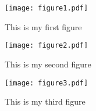 \documentclass{article}
\begin{document}
\begin{figure}[]
  \centering
  \texttt{[image: figure1.pdf]}
  \caption{This is my first figure}
  \label{fig:figure1}
\end{figure}

\begin{figure}[]
  \centering
  \texttt{[image: figure2.pdf]}
  \caption{This is my second figure}
  \label{fig:figure1}
\end{figure}

\begin{figure}[]
  \centering
  \texttt{[image: figure3.pdf]}
  \caption{This is my third figure}
  \label{fig:figure1}
\end{figure}
\end{document}

